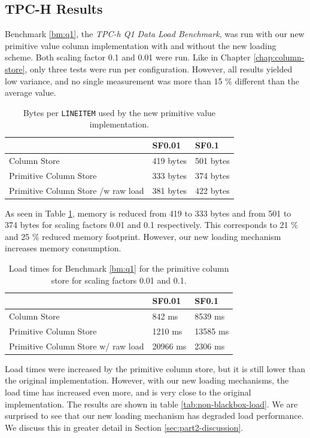 \subsection{TPC-H Results}
\label{sub:storage-format-tpch-results}
Benchmark \ref{bm:q1}, the \textit{TPC-h Q1 Data Load Benchmark}, was run with our new primitive value column implementation with and without the new loading scheme. Both scaling factor 0.1 and 0.01 were run. Like in Chapter \ref{chap:column-store}, only three tests were run per configuration. However, all results yielded low variance, and no single measurement was more than 15 \% different than the average value.

\begin{table}
    \centering
    \begin{tabularx}{\textwidth}{X | X X}
        & SF0.01 & SF0.1 \\ 
        \hline
        \hline
        Column Store & 419 bytes & 501 bytes \\
        Primitive Column Store & 333 bytes & 374 bytes \\
        Primitive Column Store /w raw load & 381 bytes & 422 bytes \\
    \end{tabularx}
    \caption{Bytes per \texttt{LINEITEM} used by the new primitive value implementation.} 
    \label{tab:primitive-bpl}
\end{table}
As seen in Table \ref{tab:primitive-bpl}, memory is reduced from 419 to 333 bytes and from 501 to 374 bytes for scaling factors 0.01 and 0.1 respectively. This corresponds to 21 \% and 25 \% reduced memory footprint. However, our new loading mechanism increases memory consumption.

\begin{table}
    \centering
    \begin{tabularx}{0.75\textwidth}{X | X X}
        & SF0.01 & SF0.1 \\ 
        \hline
        \hline
        Column Store & 842 ms & 8539 ms \\
        Primitive Column Store & 1210 ms & 13585 ms \\
        Primitive Column Store w/ raw load &  20966 ms & 2306 ms \\
    \end{tabularx}
    \caption{Load times for Benchmark \ref{bm:q1} for the primitive column store for scaling factors 0.01 and 0.1.} 
    \label{tab:primitive-load}
\end{table}
Load times were increased by the primitive column store, but it is still lower than the original implementation. However, with our new loading mechanisms, the load time has increased even more, and is very close to the original implementation. The results are shown in table \ref{tab:non-blackbox-load}. We are surprised to see that our new loading mechanism has degraded load performance. We discuss this in greater detail in Section \ref{sec:part2-discussion}. 

